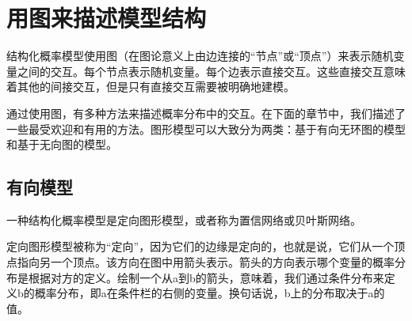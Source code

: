 \section{用图来描述模型结构}
结构化概率模型使用图（在图论意义上由边连接的“节点”或“顶点”）来表示随机变量之间的交互。每个节点表示随机变量。每个边表示直接交互。这些直接交互意味着其他的间接交互，但是只有直接交互需要被明确地建模。

通过使用图，有多种方法来描述概率分布中的交互。在下面的章节中，我们描述了一些最受欢迎和有用的方法。图形模型可以大致分为两类：基于有向无环图的模型和基于无向图的模型。

\subsection{有向模型}
一种结构化概率模型是定向图形模型，或者称为置信网络或贝叶斯网络。

定向图形模型被称为“定向”，因为它们的边缘是定向的，也就是说，它们从一个顶点指向另一个顶点。该方向在图中用箭头表示。箭头的方向表示哪个变量的概率分布是根据对方的定义。绘制一个从a到b的箭头，意味着，我们通过条件分布来定义b的概率分布，即a在条件栏的右侧的变量。换句话说，b上的分布取决于a的值。






